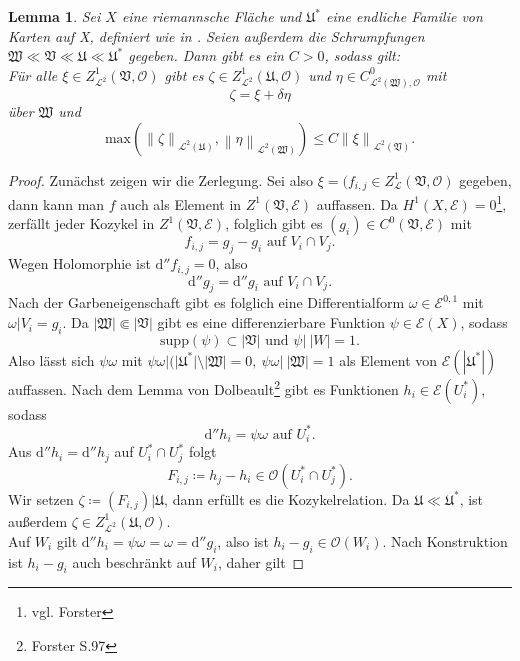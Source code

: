 \documentclass[11pt,a4paper,toc=bibliography]{scrartcl}
\theoremstyle{thm}
\newtheorem{lemma}{Lemma}[section]
\theoremstyle{def}
\theoremstyle{remark}
\newcommand{\norm}[1]{\left\lVert#1\right\rVert}
\begin{document}
\begin{lemma}
Sei $X$ eine riemannsche Fläche und $\mathfrak{U}^*$ eine endliche Familie von Karten auf X, definiert wie in . 
Seien außerdem die Schrumpfungen $\mathfrak{W}\ll\mathfrak{V}\ll\mathfrak{U}\ll\mathfrak{U}^*$ gegeben.
Dann gibt es ein $C>0$, sodass gilt:\\
Für alle $\xi\in Z^1_{\mathcal{L}^2}(\mathfrak{V},\mathcal{O})$ gibt es $\zeta\in Z^1_{\mathcal{L}^2}(\mathfrak{U},\mathcal{O})$ und $\eta\in C^0_{\mathcal{L}^2(\mathfrak{W}),\mathcal{O}}$ mit
\[
\zeta = \xi+\delta\eta
\]
über $\mathfrak{W}$ und
\[
\mathrm{max}\left( \norm{\zeta}_{\mathcal{L}^2(\mathfrak{U})},\norm{\eta}_{\mathcal{L}^2(\mathfrak{W})}\right)\leq C\norm{\xi}_{\mathcal{L}^2(\mathfrak{V})}.
\]
\end{lemma}
\begin{proof}
Zunächst zeigen wir die Zerlegung. Sei also $\xi=(f_{i,j}\in Z^1_{\mathcal{L}}(\mathfrak{V},\mathcal{O})$ gegeben, dann kann man $f$ auch als Element in $Z^1(\mathfrak{V},\mathcal{E})$ auffassen. Da $H^1(X,\mathcal{E})=0$\footnote{vgl. Forster}, zerfällt jeder Kozykel in $Z^1(\mathfrak{V},\mathcal{E})$, folglich gibt es $(g_i)\in C^0(\mathfrak{V},\mathcal{E})$ mit
\[
f_{i,j}=g_j-g_i\text{ auf } V_i\cap V_j.
\]
Wegen Holomorphie ist $\mathrm{d}''f_{i,j}=0$, also 
\[
\mathrm{d}''g_j = \mathrm{d}''g_i\text{ auf } V_i\cap V_j.
\]
Nach der Garbeneigenschaft gibt es folglich eine Differentialform $\omega\in\mathcal{E}^{0,1}$ mit $\omega|V_i=g_i$. Da $|\mathfrak{W}|\Subset|\mathfrak{V}|$ gibt es eine differenzierbare Funktion $\psi\in\mathcal{E}(X)$, sodass
\[
\mathrm{supp}(\psi)\subset|\mathfrak{V}|\text{ und } \psi|~|W|=1. 
\]
Also lässt sich $\psi\omega$ mit $\psi\omega|(|\mathfrak{U}^*|\setminus|\mathfrak{W}|=0,~\psi\omega|~|\mathfrak{W}|=1$ als Element von $\mathcal{E}(|\mathfrak{U}^*|)$ auffassen. Nach dem Lemma von Dolbeault\footnote{Forster S.97} gibt es Funktionen $h_i\in\mathcal{E}(U_i^*)$, sodass
\[
\mathrm{d}''h_i=\psi\omega\text{ auf } U_i^*.
\]
Aus $\mathrm{d}''h_i=\mathrm{d}''h_j$ auf $U_i^* \cap U_j^*$ folgt
\[
F_{i,j}\coloneqq h_j-h_i\in\mathcal{O}(U_i^*\cap U_j^*).
\]
Wir setzen $\zeta\coloneqq (F_{i,j})|\mathfrak{U}$, dann erfüllt es die Kozykelrelation. Da $\mathfrak{U}\ll\mathfrak{U}^*$, ist außerdem $\zeta\in Z^1_{\mathcal{L}^2}(\mathfrak{U},\mathcal{O})$.\\
Auf $W_i$ gilt $\mathrm{d}''h_i=\psi\omega=\omega=\mathrm{d}''g_i$, also ist $h_i-g_i\in\mathcal{O}(W_i)$.
Nach Konstruktion ist $h_i-g_i$ auch beschränkt auf $W_i$, daher gilt

\end{proof}
\end{document}
